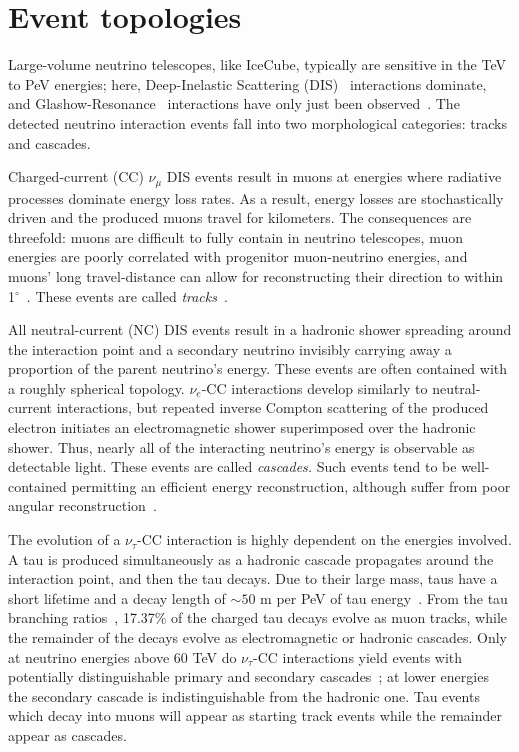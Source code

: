 \documentclass[main.tex]{subfiles}
\begin{document}
\section{Event topologies}\label{sec:event_morphology}

Large-volume neutrino telescopes, like IceCube, typically are sensitive in the TeV to PeV energies; here, Deep-Inelastic Scattering (DIS)~\cite{gandhineutrinos} interactions dominate, and Glashow-Resonance~\cite{PhysRev.118.316} interactions have only just been observed~\cite{IceCube:2021rpz}.
The detected neutrino interaction events fall into two morphological categories: tracks and cascades.

Charged-current (CC) $\nu_{\mu}$ DIS events result in muons at energies where radiative processes dominate energy loss rates.
As a result, energy losses are stochastically driven and the produced muons travel for kilometers. 
The consequences are threefold: muons are difficult to fully contain in neutrino telescopes, muon energies are poorly correlated with progenitor muon-neutrino energies, and muons' long travel-distance can allow for reconstructing their direction to within 1$^{\circ}$~\cite{trackaccuracy2017}. These events are called \textit{tracks}~\cite{icecube_energy_reco}.

All neutral-current (NC) DIS events result in a hadronic shower spreading around the interaction point and a secondary neutrino invisibly carrying away a proportion of the parent neutrino's energy. 
These events are often contained with a roughly spherical topology. 
$\nu_{e}$-CC interactions develop similarly to neutral-current interactions, but repeated inverse Compton scattering of the produced electron initiates an electromagnetic shower superimposed over the hadronic shower. 
Thus, nearly all of the interacting neutrino's energy is observable as detectable light. 
These events are called \textit{cascades.} Such events tend to be well-contained permitting an efficient energy reconstruction, although suffer from poor angular reconstruction~\cite{icecube_energy_reco}. 

The evolution of a $\nu_{\tau}$-CC interaction is highly dependent on the energies involved. A tau is produced simultaneously as a hadronic cascade propagates around the interaction point, and then the tau decays. 
Due to their large mass, taus have a short lifetime and a decay length of $\sim 50$ m per PeV of tau energy~\cite{abbasi2020measurement}. 
From the tau branching ratios~\cite{PhysRevD.98.030001}, 17.37\% of the charged tau decays evolve as muon tracks, while the remainder of the decays evolve as electromagnetic or hadronic cascades. Only at neutrino energies above 60 TeV do $\nu_{\tau}$-CC interactions yield events with potentially distinguishable primary and secondary cascades~\cite{abbasi2020measurement}; at lower energies the secondary cascade is indistinguishable from the hadronic one. Tau events which decay into muons will appear as starting track events while the remainder appear as cascades. 
\end{document}
